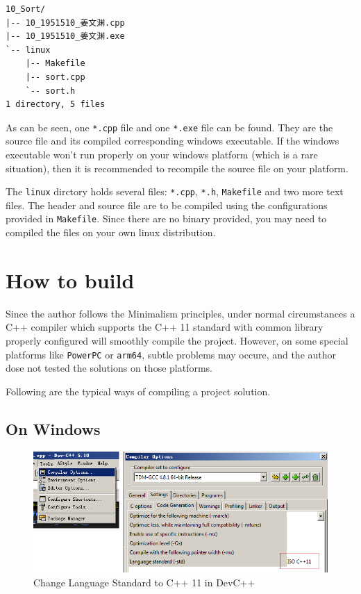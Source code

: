 \documentclass[cn,black,12pt,normal]{elegantnote}
\begin{document}
\begin{lstlisting}
10_Sort/
|-- 10_1951510_姜文渊.cpp
|-- 10_1951510_姜文渊.exe
`-- linux
    |-- Makefile
    |-- sort.cpp
    `-- sort.h
1 directory, 5 files
\end{lstlisting}

As can be seen, one \lstinline{*.cpp} file and one \lstinline{*.exe} file can be found. They are the source file and its compiled corresponding windows executable. If the windows executable won't run properly on your windows platform (which is a rare situation), then it is recommended to recompile the source file on your platform.

The \lstinline{linux} dirctory holds several files: \lstinline{*.cpp}, \lstinline{*.h}, \lstinline{Makefile} and two more text files. The header and source file are to be compiled using the configurations provided in \lstinline{Makefile}. Since there are no binary provided, you may need to compiled the files on your own linux distribution.


\section{How to build}

Since the author follows the Minimalism principles, under normal circumstances a C++ compiler which supports the C++ 11 standard with common library properly configured will smoothly compile the project. However, on some special platforms like \lstinline{PowerPC} or \lstinline{arm64}, subtle problems may occure, and the author dose not tested the solutions on those platforms.

Following are the typical ways of compiling a project solution.

\subsection{On Windows}

\begin{figure}[H]
    \centering
    \includegraphics[width=1.0\linewidth]{image/dev02.png}
    \caption{Change Language Standard to C++ 11 in DevC++}
\end{figure}
\end{document}

